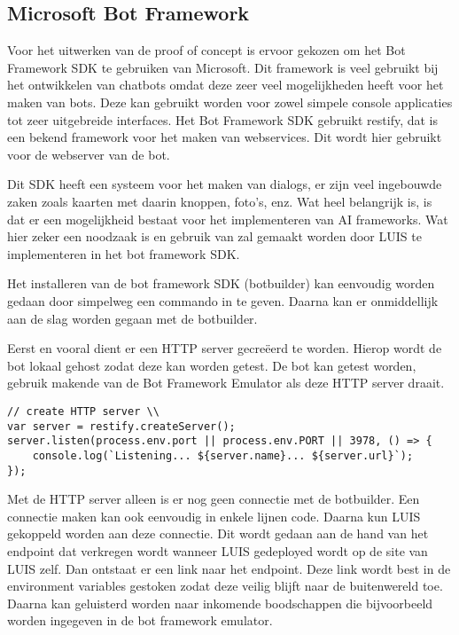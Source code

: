 \subsection{Microsoft Bot Framework}
\label{botFramework}

Voor het uitwerken van de proof of concept is ervoor gekozen om het Bot Framework SDK te gebruiken van Microsoft. Dit framework is veel gebruikt bij het ontwikkelen van chatbots omdat deze zeer veel mogelijkheden heeft voor het maken van bots. Deze kan gebruikt worden voor zowel simpele console applicaties tot zeer uitgebreide interfaces. Het Bot Framework SDK gebruikt restify, dat is een bekend framework voor het maken van webservices. Dit wordt hier gebruikt voor de webserver van de bot.

Dit SDK heeft een systeem voor het maken van dialogs, er zijn veel ingebouwde zaken zoals kaarten met daarin knoppen, foto's, enz. Wat heel belangrijk is, is dat er een mogelijkheid bestaat voor het implementeren van AI frameworks. Wat hier zeker een noodzaak is en gebruik van zal gemaakt worden door LUIS te implementeren in het bot framework SDK.

Het installeren van de bot framework SDK (botbuilder) kan eenvoudig worden gedaan door simpelweg een commando in te geven. Daarna kan er onmiddellijk aan de slag worden gegaan met de botbuilder.

Eerst en vooral dient er een HTTP server gecreëerd te worden. Hierop wordt de bot lokaal gehost zodat deze kan worden getest. De bot kan getest worden, gebruik makende van de Bot Framework Emulator als deze HTTP server draait.

\medskip
\begin{lstlisting}[caption=Creatie van de HTTP server]
// create HTTP server \\
var server = restify.createServer();
server.listen(process.env.port || process.env.PORT || 3978, () => {
	console.log(`Listening... ${server.name}... ${server.url}`);
});
\end{lstlisting}

Met de HTTP server alleen is er nog geen connectie met de botbuilder. Een connectie maken kan ook eenvoudig in enkele lijnen code. Daarna kun  LUIS gekoppeld worden aan deze connectie. Dit wordt gedaan aan de hand van het endpoint dat verkregen wordt wanneer LUIS gedeployed wordt op de site van LUIS zelf. Dan ontstaat er een link naar het endpoint. Deze link wordt best in de environment variables gestoken zodat deze veilig blijft naar de buitenwereld toe. Daarna kan geluisterd worden naar inkomende boodschappen die bijvoorbeeld worden ingegeven in de bot framework emulator. 

